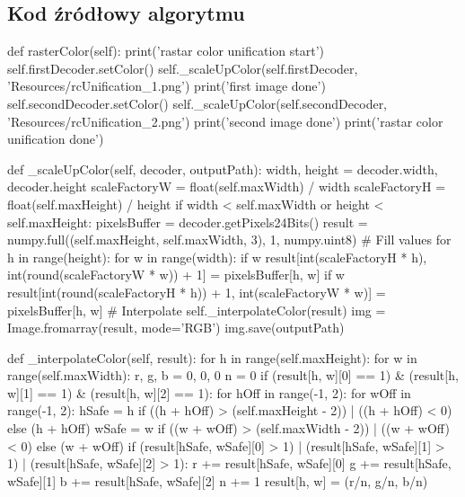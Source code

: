 \documentclass[a4paper,12pt]{book}
\begin{document}
\subsection*{Kod źródłowy algorytmu}
\begin{python}
def rasterColor(self):
	print('rastar color unification start')
	self.firstDecoder.setColor()
	self._scaleUpColor(self.firstDecoder, 'Resources/rcUnification_1.png')
	print('first image done')
	self.secondDecoder.setColor()
	self._scaleUpColor(self.secondDecoder, 'Resources/rcUnification_2.png')
	print('second image done')
	print('rastar color unification done')

def _scaleUpColor(self, decoder, outputPath):
	width, height = decoder.width, decoder.height
	scaleFactoryW = float(self.maxWidth) / width
	scaleFactoryH = float(self.maxHeight) / height
	if width < self.maxWidth or height < self.maxHeight:
		pixelsBuffer = decoder.getPixels24Bits()
		result = numpy.full((self.maxHeight, self.maxWidth, 3), 1, numpy.uint8)
		# Fill values
		for h in range(height):
			for w in range(width):
				if w%
					result[int(scaleFactoryH * h), int(round(scaleFactoryW * w)) + 1] = pixelsBuffer[h, w]
				if w%
					result[int(round(scaleFactoryH * h)) + 1, int(scaleFactoryW * w)] = pixelsBuffer[h, w]
			# Interpolate
			self._interpolateColor(result)
			img = Image.fromarray(result, mode='RGB')
			img.save(outputPath)

def _interpolateColor(self, result):
	for h in range(self.maxHeight):
		for w in range(self.maxWidth):
			r, g, b = 0, 0, 0
			n = 0
			if (result[h, w][0] == 1) & (result[h, w][1] == 1) & (result[h, w][2] == 1):
				for hOff in range(-1, 2):
					for wOff in range(-1, 2):
						hSafe = h if ((h + hOff) > (self.maxHeight - 2)) | ((h + hOff) < 0) else (h + hOff)
						wSafe = w if ((w + wOff) > (self.maxWidth - 2)) | ((w + wOff) < 0) else (w + wOff)
						if (result[hSafe, wSafe][0] > 1) | (result[hSafe, wSafe][1] > 1) | (result[hSafe, wSafe][2] > 1):
							r += result[hSafe, wSafe][0]
							g += result[hSafe, wSafe][1]
							b += result[hSafe, wSafe][2]
							n += 1
				result[h, w] = (r/n, g/n, b/n)
\end{python}
\end{document}
